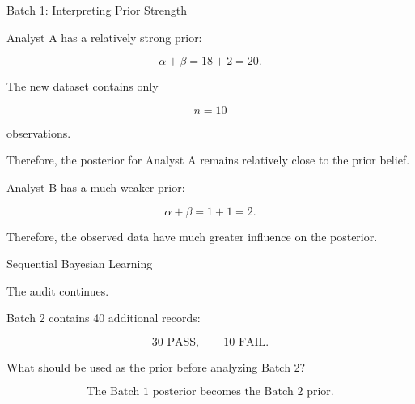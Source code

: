 \documentclass[aspectratio=43]{beamer}
\begin{document}
\begin{frame}{Batch 1: Interpreting Prior Strength}

Analyst A has a relatively strong prior:

\[
\alpha+\beta = 18+2 = 20.
\]

The new dataset contains only

\[
n=10
\]

observations.

\vspace{0.3cm}

Therefore, the posterior for Analyst A remains relatively close
to the prior belief.

\vspace{0.3cm}

Analyst B has a much weaker prior:

\[
\alpha+\beta = 1+1 = 2.
\]

Therefore, the observed data have much greater influence on the
posterior.

\end{frame}

\begin{frame}{Sequential Bayesian Learning}

The audit continues.

\vspace{0.35cm}

Batch 2 contains 40 additional records:

\[
30 \text{ PASS},
\qquad
10 \text{ FAIL}.
\]

\vspace{0.3cm}

What should be used as the prior before analyzing Batch 2?

\pause

\vspace{0.3cm}

\[
\boxed{
\text{The Batch 1 posterior becomes the Batch 2 prior.}
}
\]

\end{frame}
\end{document}
